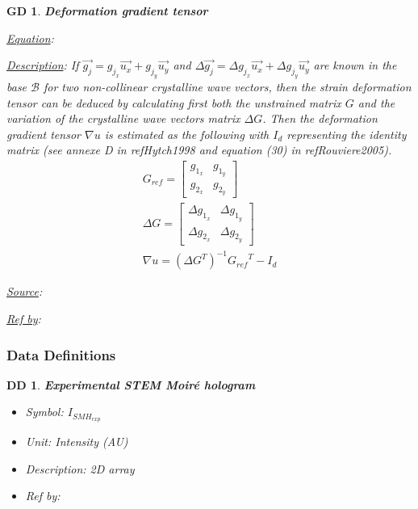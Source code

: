 \documentclass[12pt]{article}
\newtheorem{DD}{DD}
\newtheorem{GD}{GD}
\begin{document}
\begin{GD}
\normalfont \textbf{Deformation gradient tensor}
\item \underline{Equation}: 
\item \underline{Description}: If $\vec{g_j}=g_{j_{x}}\vec{u_{x}}+g_{j_{y}}\vec{u_{y}}$ and $\Delta \vec{g_{j}}=\Delta g_{j_{x}}\vec{u_{x}}+\Delta g_{j_{y}}\vec{u_{y}}$ are known in the base $\mathcal{B}$ for two non-collinear crystalline wave vectors, then the strain deformation tensor can be deduced by calculating first both the unstrained matrix $G$ and the variation of the crystalline wave vectors matrix $\Delta G$. Then the deformation gradient tensor $\nabla u$ is estimated as the following with $I_{d}$ representing the identity matrix (see annexe D in ref{Hytch1998} and equation (30) in ref{Rouviere2005}). 
\begin{equation}
\begin{gathered}
	G_{ref} =
	\begin{bmatrix}
	g_{1_{x}} & g_{1_{y}} \\
	g_{2_{x}} & g_{2_{y}} 
	\end{bmatrix} \\
	\Delta G =
	\begin{bmatrix}
	\Delta g_{1_{x}} & \Delta g_{1_{y}} \\
	\Delta g_{2_{x}} & \Delta g_{2_{y}} 
	\end{bmatrix} \\
\nabla u = ({\Delta G}^{T})^{-1}{G_{ref}}^{T}-I_{d}
\end{gathered}
\label{eq:strain_1}
\end{equation}
\item \underline{Source}:\cite{Hytch1998,Rouviere2005}
\item \underline{Ref by}:
\label{GD_3}
\end{GD}

\subsubsection{Data Definitions}\label{sec_datadef}

\renewcommand{\labelitemi}{$\star$}

\begin{DD}
\normalfont \textbf{Experimental STEM Moir{\'e} hologram}
\begin{itemize}
\item {Symbol}: $I_{SMH_{exp}}$
\item {Unit}: Intensity (AU)
\item {Description}: 2D array
\item {Ref by}:
\end{itemize}
\label{DD_1}
\end{DD}
\end{document}
